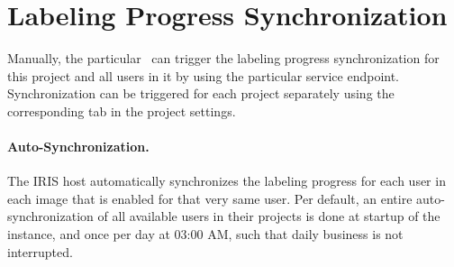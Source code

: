 \section{Labeling Progress Synchronization}
Manually, the particular \pjcoord\ can trigger the labeling progress synchronization for this project and all users in it by using the particular service endpoint. 
Synchronization can be triggered for each project separately using the corresponding tab in the project settings. 

\tobedone

\paragraph{Auto-Synchronization.}
The IRIS host automatically synchronizes the labeling progress for each user in each image that is enabled for that very same user. 
Per default, an entire auto-synchronization of all available users in their projects is done at startup of the instance, and once per day at 03:00 AM, such that daily business is not interrupted. 






